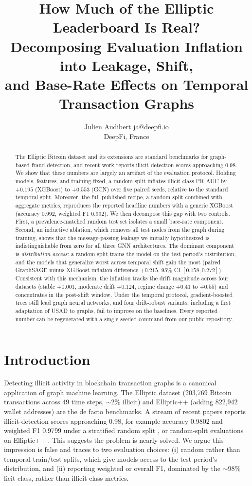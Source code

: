 \documentclass[10pt]{article}
\title{How Much of the Elliptic Leaderboard Is Real?\\
Decomposing Evaluation Inflation into Leakage, Shift,\\
and Base-Rate Effects on Temporal Transaction Graphs}
\author{\name Julien Audibert \email ja@deepfi.io \\
      \addr DeepFi, France}
\begin{document}
\maketitle

\begin{abstract}
The Elliptic Bitcoin dataset and its extensions are standard benchmarks for
graph-based fraud detection, and recent work reports illicit-detection scores
approaching 0.98. We show that these numbers are largely an artifact of the
evaluation protocol. Holding models, features, and training fixed, a random split
inflates illicit-class PR-AUC by $+0.195$ (XGBoost) to $+0.553$ (GCN) over five
paired seeds, relative to the standard temporal split. Moreover, the full
published recipe, a random split combined with aggregate metrics, reproduces the
reported headline numbers with a generic XGBoost (accuracy 0.992, weighted F1
0.992). We then decompose this gap with two controls. First, a prevalence-matched
random test set isolates a small base-rate component. Second, an inductive
ablation, which removes all test nodes from the graph during training, shows that
the message-passing leakage we initially hypothesized is indistinguishable from
zero for all three GNN architectures. The dominant component is
\emph{distribution access}: a random split trains the model on the test period's
distribution, and the models that generalize worst across temporal shift gain the
most (paired GraphSAGE minus XGBoost inflation difference $+0.215$, 95\% CI
$[0.158, 0.272]$). Consistent with this mechanism, the inflation tracks the drift
magnitude across four datasets (stable $+0.001$, moderate drift $+0.124$, regime
change $+0.41$ to $+0.55$) and concentrates in the post-shift window. Under the
temporal protocol, gradient-boosted trees still lead graph neural networks, and
four drift-robust variants, including a first adaptation of USAD to graphs, fail
to improve on the baselines. Every reported number can be regenerated with a
single seeded command from our public repository.
\end{abstract}

\section{Introduction}
Detecting illicit activity in blockchain transaction graphs is a canonical
application of graph machine learning. The Elliptic dataset
\citep{weber2019aml} (203{,}769 Bitcoin transactions across 49 time steps,
$\sim$2\% illicit) and Elliptic++ \citep{elmougy2023elliptic} (adding 822{,}942
wallet addresses) are the de facto benchmarks. A stream of recent papers reports
illicit-detection scores approaching 0.98, for example accuracy 0.9802 and
weighted F1 0.9799 under a stratified random split \citep{lin2026wavelet}, or
random-split evaluations on Elliptic++ \citep{nguyen2025sagefin}. This suggests
the problem is nearly solved. We
argue this impression is false and traces to two evaluation choices: (i) random
rather than temporal train/test splits, which give models access to the test
period's distribution, and (ii) reporting weighted or overall F1, dominated by the
$\sim$98\% licit class, rather than illicit-class metrics.
\end{document}
